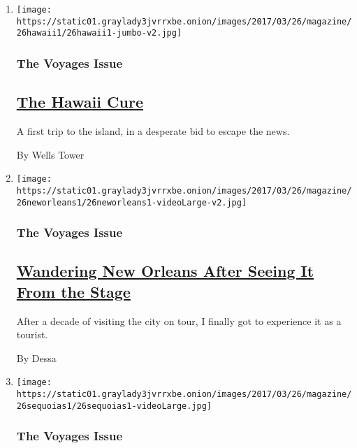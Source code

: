 \begin{enumerate}
\def\labelenumi{\arabic{enumi}.}
\item
  \texttt{[image: https://static01.graylady3jvrrxbe.onion/images/2017/03/26/magazine/26hawaii1/26hawaii1-jumbo-v2.jpg]}

  \hypertarget{the-voyages-issue-2}{%
  \subsubsection{The Voyages Issue}\label{the-voyages-issue-2}}

  \hypertarget{the-hawaii-cure}{%
  \subsection{\texorpdfstring{\href{/2017/03/21/magazine/hawaii-travels-escape.html}{The
  Hawaii Cure}}{The Hawaii Cure}}\label{the-hawaii-cure}}

  A first trip to the island, in a desperate bid to escape the news.

  By Wells Tower
\item
  \texttt{[image: https://static01.graylady3jvrrxbe.onion/images/2017/03/26/magazine/26neworleans1/26neworleans1-videoLarge-v2.jpg]}

  \hypertarget{the-voyages-issue-3}{%
  \subsubsection{The Voyages Issue}\label{the-voyages-issue-3}}

  \hypertarget{wandering-new-orleans-after-seeing-it-from-the-stage}{%
  \subsection{\texorpdfstring{\href{/2017/03/21/magazine/dessa-rapper-wanders-new-orleans.html}{Wandering
  New Orleans After Seeing It From the
  Stage}}{Wandering New Orleans After Seeing It From the Stage}}\label{wandering-new-orleans-after-seeing-it-from-the-stage}}

  After a decade of visiting the city on tour, I finally got to
  experience it as a tourist.

  By Dessa
\item
  \texttt{[image: https://static01.graylady3jvrrxbe.onion/images/2017/03/26/magazine/26sequoias1/26sequoias1-videoLarge.jpg]}

  \hypertarget{the-voyages-issue-4}{%
  \subsubsection{The Voyages Issue}\label{the-voyages-issue-4}}


\end{enumerate}

